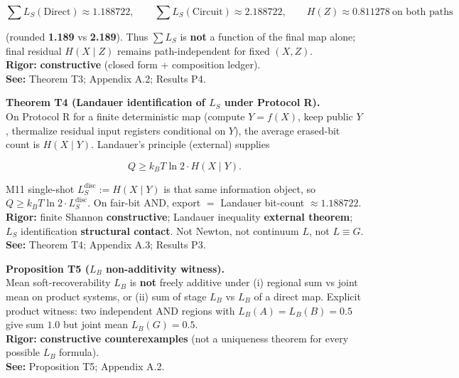 \documentclass[
  11pt,
]{article}
\begin{document}
\[
\sum L_S(\mathrm{Direct})\approx 1.188722,\qquad
\sum L_S(\mathrm{Circuit})\approx 2.188722,\qquad
H(Z)\approx 0.811278\ \text{on both paths}
\]

(rounded \textbf{1.189} vs \textbf{2.189}). Thus \(\sum L_S\) is
\textbf{not} a function of the final map alone; final residual
\(H(X\mid Z)\) remains path-independent for fixed \((X,Z)\).\\
\textbf{Rigor:} \textbf{constructive} (closed form + composition
ledger).\\
\textbf{See:} Theorem T3; Appendix A.2; Results P4.

\textbf{Theorem T4 (Landauer identification of \(L_S\) under Protocol
R).}\\
On Protocol R for a finite deterministic map (compute \(Y=f(X)\), keep
public \(Y\), thermalize residual input registers conditional on \(Y\)),
the average erased-bit count is \(H(X\mid Y)\). Landauer's principle
(external) supplies

\[
Q\ge k_B T\ln 2\cdot H(X\mid Y).
\]

M11 single-shot \(L_S^{\mathrm{disc}}:=H(X\mid Y)\) is that same
information object, so \(Q\ge k_B T\ln 2\cdot L_S^{\mathrm{disc}}\). On
fair-bit AND, export \(=\) Landauer bit-count \(\approx 1.188722\).\\
\textbf{Rigor:} finite Shannon \textbf{constructive}; Landauer
inequality \textbf{external theorem}; \(L_S\) identification
\textbf{structural contact}. Not Newton, not continuum \(L\), not
\(L\equiv G\).\\
\textbf{See:} Theorem T4; Appendix A.3; Results P3.

\textbf{Proposition T5 (\(L_B\) non-additivity witness).}\\
Mean soft-recoverability \(L_B\) is \textbf{not} freely additive under
(i) regional sum vs joint mean on product systems, or (ii) sum of stage
\(L_B\) vs \(L_B\) of a direct map. Explicit product witness: two
independent AND regions with \(L_B(A)=L_B(B)=0.5\) give sum \(1.0\) but
joint mean \(L_B(G)=0.5\).\\
\textbf{Rigor:} \textbf{constructive counterexamples} (not a uniqueness
theorem for every possible \(L_B\) formula).\\
\textbf{See:} Proposition T5; Appendix A.2.
\end{document}
